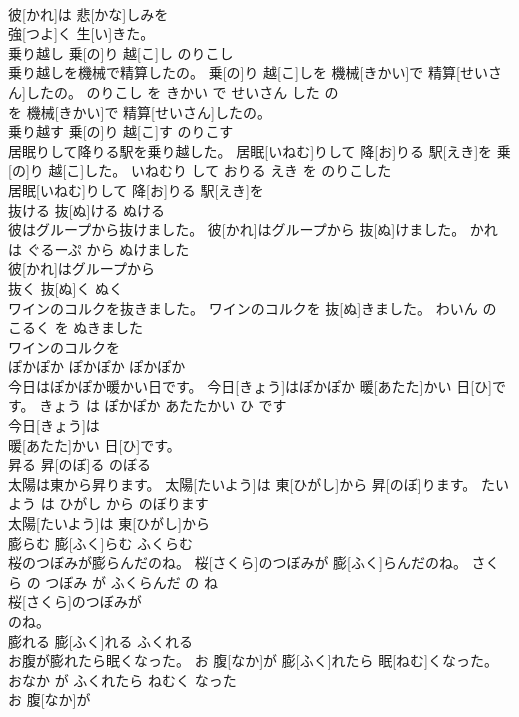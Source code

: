 \documentclass[8pt]{extreport}
\begin{document}
\begin{CJK}{UTF8}{min}
\\	彼[かれ]は 悲[かな]しみを
\\	強[つよ]く 生[い]きた。			
\\	乗り越し	乗[の]り 越[こ]し	のりこし	
\\	乗り越しを機械で精算したの。	乗[の]り 越[こ]しを 機械[きかい]で 精算[せいさん]したの。	のりこし を きかい で せいさん した の	
\\	を 機械[きかい]で 精算[せいさん]したの。			
\\	乗り越す	乗[の]り 越[こ]す	のりこす	
\\	居眠りして降りる駅を乗り越した。	居眠[いねむ]りして 降[お]りる 駅[えき]を 乗[の]り 越[こ]した。	いねむり して おりる えき を のりこした	
\\	居眠[いねむ]りして 降[お]りる 駅[えき]を
\\	抜ける	抜[ぬ]ける	ぬける	
\\	彼はグループから抜けました。	彼[かれ]はグループから 抜[ぬ]けました。	かれ は ぐるーぷ から ぬけました	
\\	彼[かれ]はグループから
\\	抜く	抜[ぬ]く	ぬく	
\\	ワインのコルクを抜きました。	ワインのコルクを 抜[ぬ]きました。	わいん の こるく を ぬきました	
\\	ワインのコルクを
\\	ぽかぽか	ぽかぽか	ぽかぽか	
\\	今日はぽかぽか暖かい日です。	今日[きょう]はぽかぽか 暖[あたた]かい 日[ひ]です。	きょう は ぽかぽか あたたかい ひ です	
\\	今日[きょう]は
\\	暖[あたた]かい 日[ひ]です。			
\\	昇る	昇[のぼ]る	のぼる	
\\	太陽は東から昇ります。	太陽[たいよう]は 東[ひがし]から 昇[のぼ]ります。	たいよう は ひがし から のぼります	
\\	太陽[たいよう]は 東[ひがし]から
\\	膨らむ	膨[ふく]らむ	ふくらむ	
\\	桜のつぼみが膨らんだのね。	桜[さくら]のつぼみが 膨[ふく]らんだのね。	さくら の つぼみ が ふくらんだ の ね	
\\	桜[さくら]のつぼみが
\\	のね。			
\\	膨れる	膨[ふく]れる	ふくれる	
\\	お腹が膨れたら眠くなった。	お 腹[なか]が 膨[ふく]れたら 眠[ねむ]くなった。	おなか が ふくれたら ねむく なった	
\\	お 腹[なか]が

\end{CJK}
\end{document}
